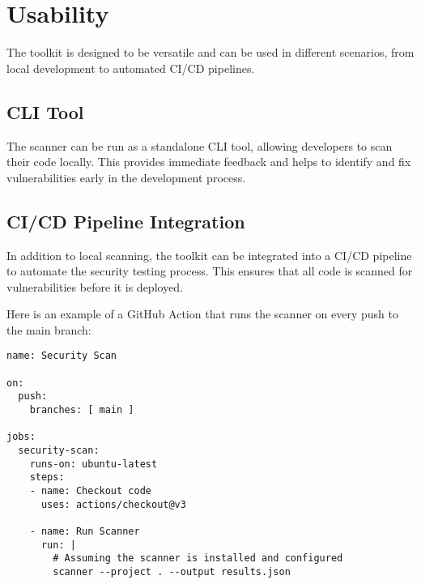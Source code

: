 \section{Usability}

The toolkit is designed to be versatile and can be used in different scenarios, from local development to automated CI/CD pipelines.

\subsection{CLI Tool}

The scanner can be run as a standalone CLI tool, allowing developers to scan their code locally. This provides immediate feedback and helps to identify and fix vulnerabilities early in the development process.

\subsection{CI/CD Pipeline Integration}

In addition to local scanning, the toolkit can be integrated into a CI/CD pipeline to automate the security testing process. This ensures that all code is scanned for vulnerabilities before it is deployed.

Here is an example of a GitHub Action that runs the scanner on every push to the main branch:

\begin{verbatim}
name: Security Scan

on:
  push:
    branches: [ main ]

jobs:
  security-scan:
    runs-on: ubuntu-latest
    steps:
    - name: Checkout code
      uses: actions/checkout@v3

    - name: Run Scanner
      run: |
        # Assuming the scanner is installed and configured
        scanner --project . --output results.json
\end{verbatim}
